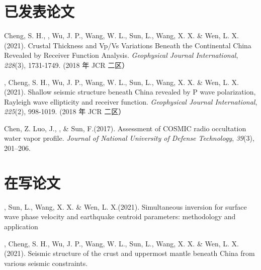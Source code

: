\newcommand{\Revision}{\textit{under revision}}
\newcommand{\CS}{*} %
\newcommand{\CF}{\textsuperscript{\#}} %


\section*{已发表论文}

\begin{etaremune}
\item
    Cheng, S. H., \Xiao, Wu, J. P., Wang, W. L., Sun, L., Wang, X. X. \& Wen, L. X.(2021).
    Crustal Thickness and Vp/Vs Variations Beneath the Continental China Revealed by Receiver Function Analysis.
    \textit{Geophysical Journal International}, \textit{228}(3), 1731-1749. (2018 年 JCR 二区）
\item
    \Xiao, Cheng, S. H., Wu, J. P., Wang, W. L., Sun, L., Wang, X. X. \& Wen, L. X.(2021).
    Shallow seismic structure beneath China revealed by P wave polarization, Rayleigh wave ellipticity and receiver function.
    \textit{Geophysical Journal International}, \textit{225}(2), 998-1019. (2018 年 JCR 二区）
\item
    Chen, Z. Luo, J.,  \Xiao, \& Sun, F.(2017).
    Assessment of COSMIC radio occultation water vapor profile.
    \textit{Journal of National University of Defense Technology}, \textit{39}(3), 201--206. 
\end{etaremune}


\section*{在写论文}
\begin{etaremune}
\item
    \Xiao, Sun, L., Wang, X. X. \& Wen, L. X.(2021).
    Simultaneous inversion for surface wave phase velocity and earthquake centroid parameters: methodology and application
\item
    \Xiao, Cheng, S. H., Wu, J. P., Wang, W. L., Sun, L., Wang, X. X. \& Wen, L. X.(2021).
    Seismic structure of the crust and uppermost mantle beneath China from various seismic constraints.
\end{etaremune}

